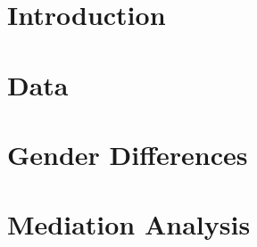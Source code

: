 %
\tableofcontents

\doublespacing

\section{Introduction}
\label{sec:introduction}
	

\section{Data}
\label{sec:data}
	

\section{Gender Differences}
\label{sec:gdiff}
		

\section{Mediation Analysis}
\label{sec:results}


%	

\clearpage
\singlespacing




